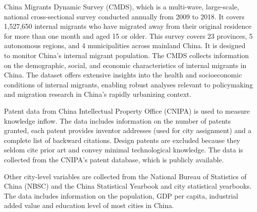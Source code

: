 \documentclass[12pt]{article}
\begin{document}
China Migrants Dynamic Survey (CMDS), which is a multi-wave, large-scale, national cross-sectional survey conducted annually from 2009 to 2018\citep{nationalhealthcommissionChinaMigrantsDynamic2018, zhangDatasetDynamicMonitoring2023}. It covers 1,527,650 internal migrants who have migrated away from their original residence for more than one month and aged 15 or older. This survey covers 23 provinces, 5 autonomous regions, and 4 municipalities across mainland China. It is designed to monitor China's internal migrant population. The CMDS collects information on the demographic, social, and economic characteristics of internal migrants in China. The dataset offers extensive insights into the health and socioeconomic conditions of internal migrants, enabling robust analyses relevant to policymaking and migration research in China's rapidly urbanizing context.

Patent data from China Intellectual Property Office (CNIPA) is used to measure knowledge inflow. The data includes information on the number of patents granted, each patent provides inventor addresses (used for city assignment) and a complete list of backward citations. Design patents are excluded because they seldom cite prior art and convey minimal technological knowledge. The data is collected from the CNIPA's patent database, which is publicly available.

Other city-level variables are collected from the National Bureau of Statistics of China (NBSC) and the China Statistical Yearbook and city statistical yearbooks\citep{nationalbureauofstatisticsofchinanbsChinaStatisticalYearbook2025}. The data includes information on the population, GDP per capita, industrial added value and education level of most cities in China. 
\end{document}
